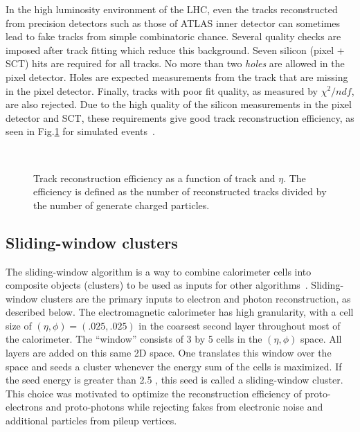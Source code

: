In the high luminosity environment of the LHC, even the tracks reconstructed from precision detectors such as those of ATLAS inner detector can sometimes lead to fake tracks from simple combinatoric chance.
Several quality checks are imposed after track fitting which reduce this background.
Seven silicon (pixel + SCT) hits are required for all tracks.
No more than two \textit{holes} are allowed in the pixel detector.
Holes are expected measurements from the track that are missing in the pixel detector.
Finally, tracks with poor fit quality, as measured by $\chi^2/ndf$, are also rejected.
Due to the high quality of the silicon measurements in the pixel detector and SCT, these requirements give good track reconstruction efficiency, as seen in Fig.\ref{fig:track_eff} for simulated events~\cite{Hamano:1489674}.
\begin{figure}
\caption{Track reconstruction efficiency as a function of track \pt and $\eta$.
The efficiency is defined as the number of reconstructed tracks divided by the number of generate charged particles.} \label{fig:track_eff}
 \\
\end{figure}

\subsection{Sliding-window clusters}\label{sec:sliding_window_cluster}

The sliding-window algorithm is a way to combine calorimeter cells into composite objects (clusters) to be used as inputs for other algorithms~\cite{PERF-2013-03}.
Sliding-window clusters are the primary inputs to electron and photon reconstruction, as described below.
The electromagnetic calorimeter has high granularity, with a cell size of $(\eta, \phi) = (.025, .025)$ in the coarsest second layer throughout most of the calorimeter.
The ``window'' consists of 3 by 5 cells in the $(\eta, \phi)$ space.
All layers are added on this same 2D space.
One translates this window over the space and seeds a cluster whenever the energy sum of the cells is maximized.
If the seed energy is greater than 2.5 \GeV, this seed is called a sliding-window cluster.
This choice was motivated to optimize the reconstruction efficiency of proto-electrons and proto-photons while rejecting fakes from electronic noise and additional particles from pileup vertices.

